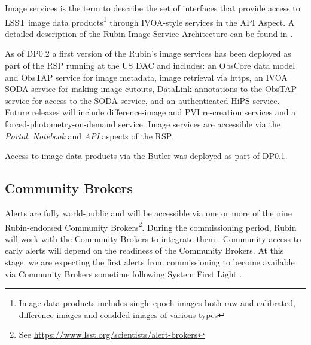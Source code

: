 Image services is the term to describe the set of interfaces that provide access to LSST image data products\footnote{Image data products includes single-epoch images both raw and calibrated, difference images and coadded images of various types} through IVOA-style services in the API Aspect. 
A detailed description of the Rubin Image Service Architecture can be found in .

As of DP0.2 a first version of the Rubin's image services has been deployed as part of the RSP running at the US DAC and includes: an ObsCore data model and ObsTAP service for image metadata, image retrieval via https, an IVOA SODA service for making image cutouts, DataLink annotations to the ObsTAP service for access to the SODA service, and an authenticated HiPS service.
Future releases will include difference-image and PVI re-creation services and a forced-photometry-on-demand service.
Image services are accessible via the \emph{Portal}, \emph{Notebook}  and  \emph{API} aspects of the RSP. 

Access to image data products via the Butler was deployed as part of DP0.1.

\subsection{Community Brokers }

Alerts are fully world-public and will be accessible via one or more of the nine Rubin-endorsed Community Brokers\footnote{See \url{https://www.lsst.org/scientists/alert-brokers}}.
During the commissioning period, Rubin will work with the Community Brokers to integrate them .
Community access to early alerts will depend on the readiness of the Community Brokers. 
At this stage, we are expecting the first alerts from commissioning to become available via Community Brokers sometime following System First Light . 
